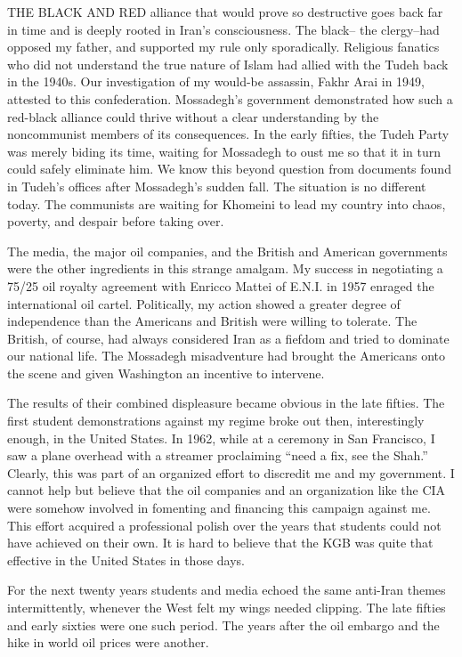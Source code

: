 THE BLACK AND RED alliance that would prove so destructive goes back far in time and is deeply rooted in Iran's consciousness. The black-- the clergy--had opposed my father, and supported my rule only sporadically. Religious fanatics who did not understand the true nature of Islam had allied with the Tudeh back in the 1940s. Our investigation of my would-be assassin, Fakhr Arai in 1949, attested to this confederation. Mossadegh’s government demonstrated how such a red-black alliance could thrive without a clear understanding by the noncommunist members of its consequences. In the early fifties, the Tudeh Party was merely biding its time, waiting for Mossadegh to oust me so that it in turn could safely eliminate him. We know this beyond question from documents found in Tudeh’s offices after Mossadegh’s sudden fall. The situation is no different today. The communists are waiting for Khomeini to lead my country into chaos, poverty, and despair before taking over. 

The media, the major oil companies, and the British and American governments were the other ingredients in this strange amalgam. My success in negotiating a 75/25 oil royalty agreement with Enricco Mattei of E.N.I. in 1957 enraged the international oil cartel. Politically, my action showed a greater degree of independence than the Americans and British were willing to tolerate. The British, of course, had always considered Iran as a fiefdom and tried to dominate our national life. The Mossadegh misadventure had brought the Americans onto the scene and given Washington an incentive to intervene. 

The results of their combined displeasure became obvious in the late fifties. The first student demonstrations against my regime broke out then, interestingly enough, in the United States. In 1962, while at a ceremony in San Francisco, I saw a plane overhead with a streamer proclaiming “need a fix, see the Shah.” Clearly, this was part of an organized effort to discredit me and my government. I cannot help but believe that the oil companies and an organization like the CIA were somehow involved in fomenting and financing this campaign against me. This effort acquired a professional polish over the years that students could not have achieved on their own. It is hard to believe that the KGB was quite that effective in the United States in those days. 

For the next twenty years students and media echoed the same anti-Iran themes intermittently, whenever the West felt my wings needed clipping. The late fifties and early sixties were one such period. The years after the oil embargo and the hike in world oil prices were another. 

